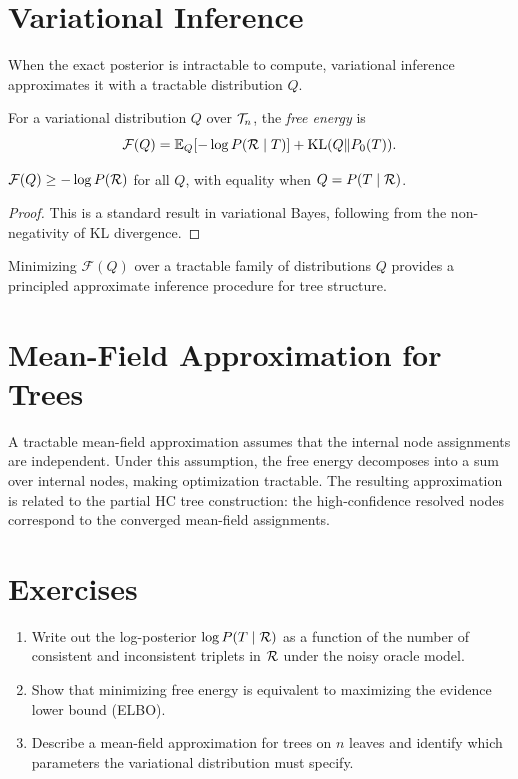 \section{Variational Inference}

When the exact posterior is intractable to compute, variational inference approximates it with a tractable distribution $Q$.

\begin{definition}
For a variational distribution $Q$ over $\mathcal{T}_n$, the \emph{free energy} is
\[
\mathcal{F}(Q) = \mathbb{E}_Q[-\log P(\mathcal{R} \mid T)] + \mathrm{KL}(Q \| P_0(T)).
\]
\end{definition}

\begin{proposition}
$\mathcal{F}(Q) \geq -\log P(\mathcal{R})$ for all $Q$, with equality when $Q = P(T \mid \mathcal{R})$.
\end{proposition}

\begin{proof}
This is a standard result in variational Bayes, following from the non-negativity of KL divergence.
\end{proof}

Minimizing $\mathcal{F}(Q)$ over a tractable family of distributions $Q$ provides a principled approximate inference procedure for tree structure.

\section{Mean-Field Approximation for Trees}

A tractable mean-field approximation assumes that the internal node assignments are independent. Under this assumption, the free energy decomposes into a sum over internal nodes, making optimization tractable. The resulting approximation is related to the partial HC tree construction: the high-confidence resolved nodes correspond to the converged mean-field assignments.

\section{Exercises}

\begin{enumerate}
  \item Write out the log-posterior $\log P(T \mid \mathcal{R})$ as a function of the number of consistent and inconsistent triplets in $\mathcal{R}$ under the noisy oracle model.
  \item Show that minimizing free energy is equivalent to maximizing the evidence lower bound (ELBO).
  \item Describe a mean-field approximation for trees on $n$ leaves and identify which parameters the variational distribution must specify.
\end{enumerate}
